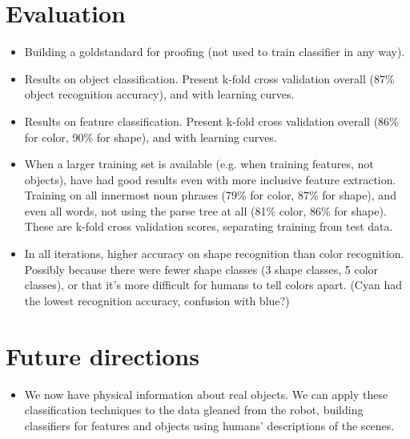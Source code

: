 \documentclass{article}
\begin{document}
\section{Evaluation}
\begin{itemize}
\item Building a goldstandard for proofing (not used to train classifier in any way).

\item Results on object classification. Present k-fold cross validation overall (87\%
object recognition accuracy), and with learning curves.

\item Results on feature classification. Present k-fold cross validation overall (86\%
for color, 90\% for shape), and with learning curves.

\item When a larger training set is available (e.g. when training features, not
objects), have had good results even with more inclusive feature extraction.
Training on all innermost noun phrases (79\% for color, 87\% for shape), and even all words, not using the parse tree at
all (81\% color, 86\% for shape). These are k-fold cross validation scores, separating training from test data.

\item In all iterations, higher accuracy on shape recognition than color
recognition. Possibly because there were fewer shape classes (3 shape classes,
5 color classes), or that it's more difficult for humans to tell colors apart.
(Cyan had the lowest recognition accuracy, confusion with blue?)
\end{itemize} 

\section{Future directions}
\begin{itemize}
\item We now have physical information about real objects. We can apply these classification techniques to the data gleaned from the robot, building classifiers for features and objects using humans' descriptions of the scenes.
\end{itemize}
\end{document}
